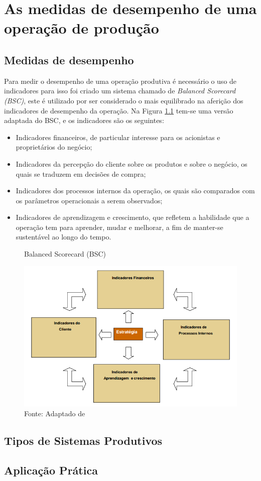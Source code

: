 \chapter{ As medidas de desempenho de uma operação de produção} 
\label{chap:medida_desempenho_operacao_prod} 

\section{Medidas de desempenho} 
\label{sec:sistemas_produtivos_desempenho} 
Para medir o desempenho de uma operação produtiva é necessário o uso de indicadores para isso foi criado um sistema chamado de \textit{Balanced Scorecard (BSC)}, este é utilizado por ser considerado o mais equilibrado na aferição dos indicadores de desempenho da operação.
Na Figura \ref{fig:balanced_scorecard} tem-se uma versão adaptada do BSC, e os indicadores são os seguintes:

\begin{itemize}
    \item Indicadores financeiros, de particular interesse para os acionistas e proprietários do negócio;
    \item Indicadores da percepção do cliente sobre os produtos e sobre o negócio, os quais se traduzem em decisões de compra;
    \item Indicadores dos processos internos da operação, os quais são comparados com os parâmetros operacionais a serem observados;
    \item Indicadores de aprendizagem e crescimento, que refletem a habilidade que a operação tem para aprender, mudar e melhorar, a fim de manter-se sustentável ao longo do tempo.  
\end{itemize}


\begin{figure}[H]
    \caption{Balanced Scorecard (BSC)}
    \includegraphics[width =\textwidth]{images/bsc.png}
    \caption*{Fonte: Adaptado de \cite{kaplan1996using}}
    \label{fig:balanced_scorecard}
\end{figure}


\section{Tipos de Sistemas Produtivos}
\label{sec:metaplic}

\section{Aplicação Prática} 
\label{sec:estrategia_da_producao_aplicacao}


